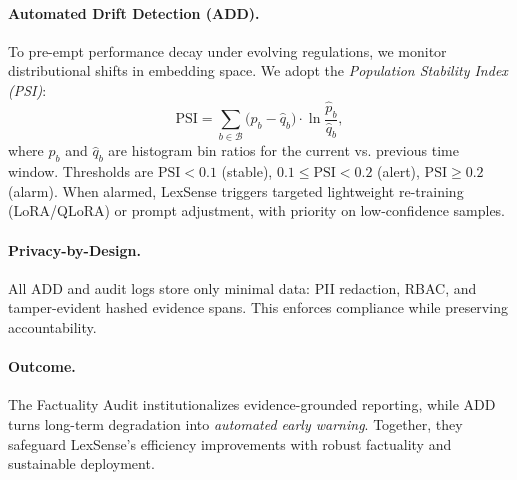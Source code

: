 {\paragraph{Automated Drift Detection (ADD).}
To pre-empt performance decay under evolving regulations, we monitor distributional shifts in embedding space.  
We adopt the \emph{Population Stability Index (PSI)}:
\[
\mathrm{PSI}=\sum_{b\in \mathcal{B}}
\big(\hat{p}_b-\hat{q}_b\big)\cdot \ln\frac{\hat{p}_b}{\hat{q}_b},
\]
where $\hat{p}_b$ and $\hat{q}_b$ are histogram bin ratios for the current vs. previous time window.  
Thresholds are $\mathrm{PSI}<0.1$ (stable), $0.1\!\le\!\mathrm{PSI}\!<\!0.2$ (alert), $\mathrm{PSI}\!\ge\!0.2$ (alarm).  
When alarmed, LexSense triggers targeted lightweight re-training (LoRA/QLoRA) or prompt adjustment, with priority on low-confidence samples.

\paragraph{Privacy-by-Design.}
All ADD and audit logs store only minimal data: PII redaction, RBAC, and tamper-evident hashed evidence spans.  
This enforces compliance while preserving accountability.

\paragraph{Outcome.}
The Factuality Audit institutionalizes evidence-grounded reporting, while ADD turns long-term degradation into \emph{automated early warning}. 
Together, they safeguard LexSense’s efficiency improvements with robust factuality and sustainable deployment.

}
